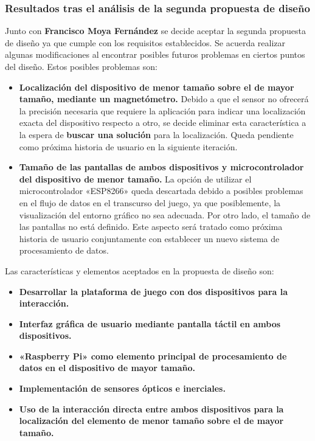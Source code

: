 \subsubsection{Resultados tras el análisis de la segunda propuesta de diseño}
Junto con \textbf{Francisco Moya Fernández} se decide aceptar la segunda propuesta de diseño ya que cumple con los requisitos establecidos. Se acuerda realizar algunas modificaciones al encontrar posibles futuros problemas en ciertos puntos del diseño. Estos posibles problemas son:
\begin{itemize}
\item \textbf{Localización del dispositivo de menor tamaño sobre el de mayor tamaño, mediante un magnetómetro.} Debido a que el sensor no ofrecerá la precisión necesaria que requiere la aplicación para indicar una localización exacta del dispositivo respecto a otro, se decide eliminar esta característica a la espera de \textbf{buscar una solución} para la localización. Queda pendiente como próxima historia de usuario en la siguiente iteración.
\item \textbf{Tamaño de las pantallas de ambos dispositivos y microcontrolador del dispositivo de menor tamaño.} La opción de utilizar el microcontrolador «ESP8266» queda descartada debido a posibles problemas en el flujo de datos en el transcurso del juego, ya que posiblemente, la visualización del entorno gráfico no sea adecuada. Por otro lado, el tamaño de las pantallas no está definido. Este aspecto será tratado como próxima historia de usuario conjuntamente con establecer un nuevo sistema de procesamiento de datos.
\end{itemize}

Las características y elementos aceptados en la propuesta de diseño son:\
\begin{itemize}
\item \textbf{Desarrollar la plataforma de juego con dos dispositivos para la interacción.}
\item \textbf{Interfaz gráfica de usuario mediante pantalla táctil en ambos dispositivos.}
\item \textbf{«Raspberry Pi» como elemento principal de procesamiento de datos en el dispositivo de mayor tamaño.}
\item \textbf{Implementación de sensores ópticos e inerciales.} 
\item \textbf{Uso de la interacción directa entre ambos dispositivos para la localización del elemento de menor tamaño sobre el de mayor tamaño.}
\end{itemize}

